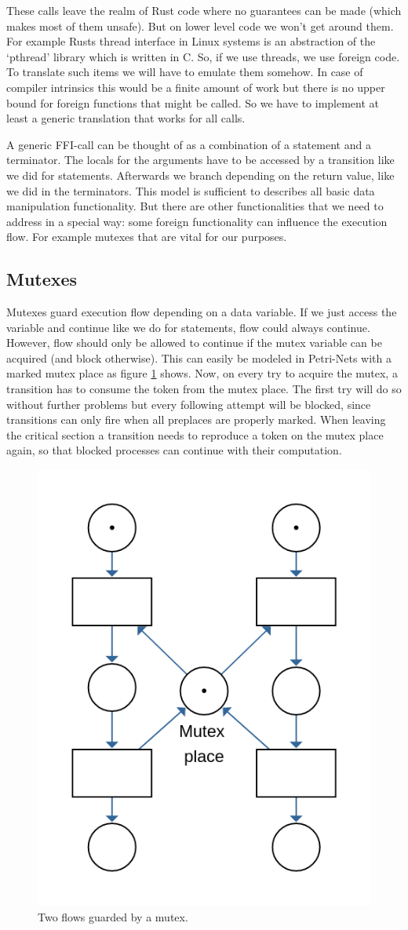 These calls leave the realm of Rust code where no guarantees can be made (which makes most of them unsafe).
But on lower level code we won't get around them.
For example Rusts thread interface in Linux systems is an abstraction of the `pthread' library which is written in C.
So, if we use threads, we use foreign code.
To translate such items we will have to emulate them somehow.
In case of compiler intrinsics this would be a finite amount of work but there is no upper bound for foreign functions that might be called.
So we have to implement at least a generic translation that works for all calls.

A generic FFI-call can be thought of as a combination of a statement and a terminator.
The locals for the arguments have to be accessed by a transition like we did for statements.
Afterwards we branch depending on the return value, like we did in the terminators.
This model is sufficient to describes all basic data manipulation functionality.
But there are other functionalities that we need to address in a special way:
some foreign functionality can influence the execution flow.
For example mutexes that are vital for our purposes.

\subsection*{Mutexes}
Mutexes guard execution flow depending on a data variable.
If we just access the variable and continue like we do for statements, flow could always continue.
However, flow should only be allowed to continue if the mutex variable can be acquired (and block otherwise).
This can easily be modeled in Petri-Nets with a marked mutex place as figure \ref{mutex_net} shows.
Now, on every try to acquire the mutex, a transition has to consume the token from the mutex place.
The first try will do so without further problems but every following attempt will be blocked, since transitions can only fire when all preplaces are properly marked.
When leaving the critical section a transition needs to reproduce a token on the mutex place again, so that blocked processes can continue with their computation.
\begin{figure}
    \centering
    \includegraphics[width=.4\textwidth]{../diagrams/mutexNet.png}
    \caption{Two flows guarded by a mutex.}
    \label{mutex_net}
\end{figure}

